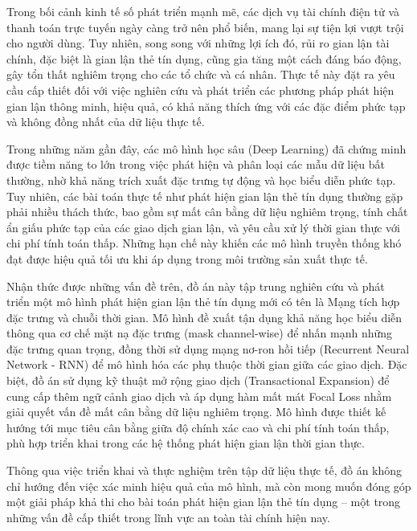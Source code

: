 
Trong bối cảnh kinh tế số phát triển mạnh mẽ, các dịch vụ tài chính điện tử và thanh toán trực tuyến ngày càng trở nên phổ biến, mang lại sự tiện lợi vượt trội cho người dùng. Tuy nhiên, song song với những lợi ích đó, rủi ro gian lận tài chính, đặc biệt là gian lận thẻ tín dụng, cũng gia tăng một cách đáng báo động, gây tổn thất nghiêm trọng cho các tổ chức và cá nhân. Thực tế này đặt ra yêu cầu cấp thiết đối với việc nghiên cứu và phát triển các phương pháp phát hiện gian lận thông minh, hiệu quả, có khả năng thích ứng với các đặc điểm phức tạp và không đồng nhất của dữ liệu thực tế.

Trong những năm gần đây, các mô hình học sâu (Deep Learning) đã chứng minh được tiềm năng to lớn trong việc phát hiện và phân loại các mẫu dữ liệu bất thường, nhờ khả năng trích xuất đặc trưng tự động và học biểu diễn phức tạp. Tuy nhiên, các bài toán thực tế như phát hiện gian lận thẻ tín dụng thường gặp phải nhiều thách thức, bao gồm sự mất cân bằng dữ liệu nghiêm trọng, tính chất ẩn giấu phức tạp của các giao dịch gian lận, và yêu cầu xử lý thời gian thực với chi phí tính toán thấp. Những hạn chế này khiến các mô hình truyền thống khó đạt được hiệu quả tối ưu khi áp dụng trong môi trường sản xuất thực tế.

Nhận thức được những vấn đề trên, đồ án này tập trung nghiên cứu và phát triển một mô hình phát hiện gian lận thẻ tín dụng mới có tên là Mạng tích hợp đặc trưng và chuỗi thời gian. Mô hình đề xuất tận dụng khả năng học biểu diễn thông qua cơ chế mặt nạ đặc trưng (mask channel-wise) để nhấn mạnh những đặc trưng quan trọng, đồng thời sử dụng mạng nơ-ron hồi tiếp (Recurrent Neural Network - RNN) để mô hình hóa các phụ thuộc thời gian giữa các giao dịch. Đặc biệt, đồ án sử dụng kỹ thuật mở rộng giao dịch (Transactional Expansion) để cung cấp thêm ngữ cảnh giao dịch và áp dụng hàm mất mát Focal Loss nhằm giải quyết vấn đề mất cân bằng dữ liệu nghiêm trọng. Mô hình được thiết kế hướng tới mục tiêu cân bằng giữa độ chính xác cao và chi phí tính toán thấp, phù hợp triển khai trong các hệ thống phát hiện gian lận thời gian thực.

Thông qua việc triển khai và thực nghiệm trên tập dữ liệu thực tế, đồ án không chỉ hướng đến việc xác minh hiệu quả của mô hình, mà còn mong muốn đóng góp một giải pháp khả thi cho bài toán phát hiện gian lận thẻ tín dụng – một trong những vấn đề cấp thiết trong lĩnh vực an toàn tài chính hiện nay.

